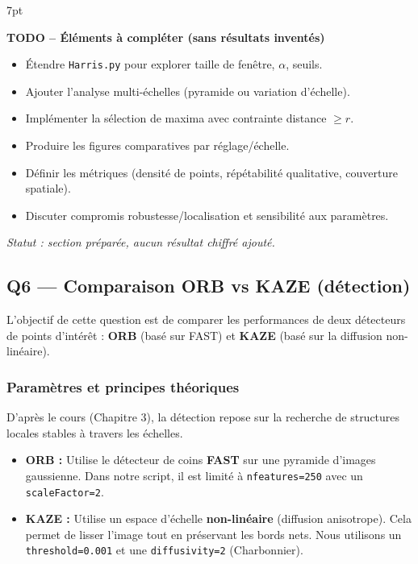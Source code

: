 \documentclass[11pt,a4paper]{article}
\newenvironment{formal}{%
\def\FrameCommand{%
  \hspace{1pt}%
  {\color{enstaBleuFonce}\vrule width 2pt}%
  {\color{formalshade}\vrule width 4pt}%
  \colorbox{formalshade}%
}%
\MakeFramed{\advance\hsize-\width\FrameRestore}%
\noindent\hspace{-4.55pt}%
\begin{adjustwidth}{}{7pt}%
\vspace{4pt}%
}{%
\vspace{4pt}\end{adjustwidth}\endMakeFramed%
}
\begin{document}
\begin{formal}
\textbf{TODO -- Éléments à compléter (sans résultats inventés)}
\begin{itemize}[leftmargin=1.5em]
  \item Étendre \texttt{Harris.py} pour explorer taille de fenêtre, \(\alpha\), seuils.
  \item Ajouter l'analyse multi-échelles (pyramide ou variation d'échelle).
  \item Implémenter la sélection de maxima avec contrainte distance \(\ge r\).
  \item Produire les figures comparatives par réglage/échelle.
  \item Définir les métriques (densité de points, répétabilité qualitative, couverture spatiale).
  \item Discuter compromis robustesse/localisation et sensibilité aux paramètres.
\end{itemize}
\end{formal}
\textit{Statut : section préparée, aucun résultat chiffré ajouté.}

\subsection{Q6 --- Comparaison ORB vs KAZE (détection)}
L'objectif de cette question est de comparer les performances de deux détecteurs de points d'intérêt : \textbf{ORB} (basé sur FAST) et \textbf{KAZE} (basé sur la diffusion non-linéaire).

\subsubsection{Paramètres et principes théoriques}

D'après le cours (Chapitre 3), la détection repose sur la recherche de structures locales stables à travers les échelles.
\begin{itemize}
    \item \textbf{ORB :} Utilise le détecteur de coins \textbf{FAST} sur une pyramide d'images gaussienne. Dans notre script, il est limité à \texttt{nfeatures=250} avec un \texttt{scaleFactor=2}.
    \item \textbf{KAZE :} Utilise un espace d'échelle \textbf{non-linéaire} (diffusion anisotrope). Cela permet de lisser l'image tout en préservant les bords nets. Nous utilisons un \texttt{threshold=0.001} et une \texttt{diffusivity=2} (Charbonnier).
\end{itemize}
\end{document}
